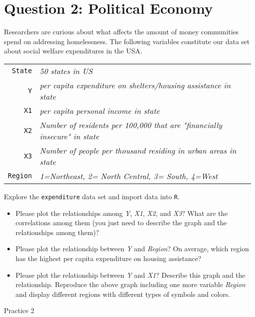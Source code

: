 \documentclass[12pt,letterpaper]{article}
\begin{document}
\newpage

	\section*{Question 2: Political Economy}

\noindent Researchers are curious about what affects the amount of money communities spend on addressing homelessness. The following variables constitute our data set about social welfare expenditures in the USA. \\
\vspace{.5cm}


\begin{tabular}{r|l}
	\texttt{State} &\emph{50 states in US} \\
	\texttt{Y} & \emph{per capita expenditure on shelters/housing assistance in state}\\
	\texttt{X1} &\emph{per capita personal income in state} \\
	\texttt{X2} &  \emph{Number of residents per 100,000 that are "financially insecure" in state}\\
	\texttt{X3} &  \emph{Number of people per thousand residing in urban areas in state} \\
	\texttt{Region} &  \emph{1=Northeast, 2= North Central, 3= South, 4=West} \\
\end{tabular}

\vspace{.5cm}
\noindent Explore the \texttt{expenditure} data set and import data into \texttt{R}.
\vspace{.5cm}
  
\vspace{.5cm}
\begin{itemize}

\item
Please plot the relationships among \emph{Y}, \emph{X1}, \emph{X2}, and \emph{X3}? What are the correlations among them (you just need to describe the graph and the relationships among them)?
\vspace{.5cm}
\item
Please plot the relationship between \emph{Y} and \emph{Region}? On average, which region has the highest per capita expenditure on housing assistance?
\vspace{.5cm}
\item
Please plot the relationship between \emph{Y} and \emph{X1}? Describe this graph and the relationship. Reproduce the above graph including one more variable \emph{Region} and display different regions with different types of symbols and colors.
\end{itemize}

Practice 2
\end{document}
